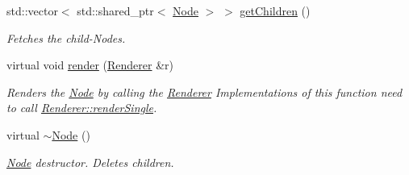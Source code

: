 \begin{DoxyCompactItemize}
std\+::vector$<$ std\+::shared\+\_\+ptr$<$ \mbox{\hyperlink{classsage_1_1Node}{Node}} $>$ $>$ \mbox{\hyperlink{classsage_1_1Node_a13a5d97132d87b57bd68eb8662f1b505}{get\+Children}} ()
\begin{DoxyCompactList}\small\item\em Fetches the child-\/\+Nodes. \end{DoxyCompactList}\item 
virtual void \mbox{\hyperlink{classsage_1_1Node_a1a5d13b9c959039084843403382f73eb}{render}} (\mbox{\hyperlink{classsage_1_1Renderer}{Renderer}} \&r)
\begin{DoxyCompactList}\small\item\em Renders the \mbox{\hyperlink{classsage_1_1Node}{Node}} by calling the \mbox{\hyperlink{classsage_1_1Renderer}{Renderer}} Implementations of this function need to call \mbox{\hyperlink{classsage_1_1Renderer_aa79cfd587fa85ae8ea7ccf465825d212}{Renderer\+::render\+Single}}. \end{DoxyCompactList}\item 
virtual \mbox{\hyperlink{classsage_1_1Node_aa0840c3cb5c7159be6d992adecd2097c}{$\sim$\+Node}} ()
\begin{DoxyCompactList}\small\item\em \mbox{\hyperlink{classsage_1_1Node}{Node}} destructor. Deletes children. \end{DoxyCompactList}\end{DoxyCompactItemize}
